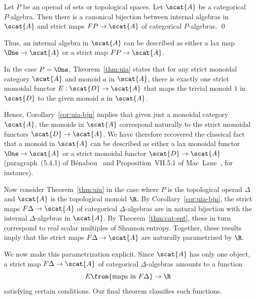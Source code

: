 \begin{cor}
Let $P$ be an operad of sets or topological spaces.  Let $\scat{A}$ be a
categorical $P$-algebra.  Then there is a canonical bijection between
internal algebras in $\scat{A}$ and strict maps $FP \to \scat{A}$ of
categorical%
% 
%
$P$-algebras.
\qed
\end{cor}

Thus, an internal algebra in $\scat{A}$ can be described as either a lax
map $\One \to \scat{A}$ or a strict map $FP \to \scat{A}$.

\begin{example}
In the case $P = \One$, Theorem~\ref{thm:uia} states that for any strict
monoidal category $\scat{A}$ and monoid $a$ in $\scat{A}$, there is exactly
one strict monoidal functor $E: \scat{D} \to \scat{A}$ that maps the
trivial monoid $1$ in $\scat{D}$ to the given monoid $a$ in $\scat{A}$.

Hence, Corollary~\ref{cor:uia-bjn} implies that given just a monoidal
category $\scat{A}$, the monoids%
% 
% 
in $\scat{A}$ correspond naturally to the strict monoidal functors
$\scat{D} \to \scat{A}$.  We have therefore recovered the classical fact
that a monoid in $\scat{A}$ can be described as either a lax monoidal
functor $\One \to \scat{A}$ or a strict monoidal functor $\scat{D} \to
\scat{A}$ (paragraph~(5.4.1) of B\'enabou~\cite{BenIB} and
Proposition~VII.5.1 of Mac~Lane~\cite{MacLCWM}, for instance).
\end{example}

Now consider Theorem~\ref{thm:uia} in the case where $P$ is the topological
operad $\Delta$ and $\scat{A}$ is the topological monoid $\R$.  By
Corollary~\ref{cor:uia-bjn}, the strict maps $F\Delta \to \scat{A}$ of
categorical $\Delta$-algebras are in natural bijection with the internal
$\Delta$-algebras in $\scat{A}$.  By Theorem~\ref{thm:cat-ent}, these in
turn correspond to real scalar multiples of Shannon entropy.  Together,
these results imply that the strict maps $F\Delta \to \scat{A}$ are
naturally parametrized by $\R$.

We now make this parametrization explicit.  Since $\scat{A}$ has only one
object, a strict map $F\Delta \to \scat{A}$ of categorical
$\Delta$-algebras amounts to a function
\[
E \from \{ \text{maps in } F\Delta \} \to \R
\]
satisfying certain conditions.  Our final theorem classifies such functions.

